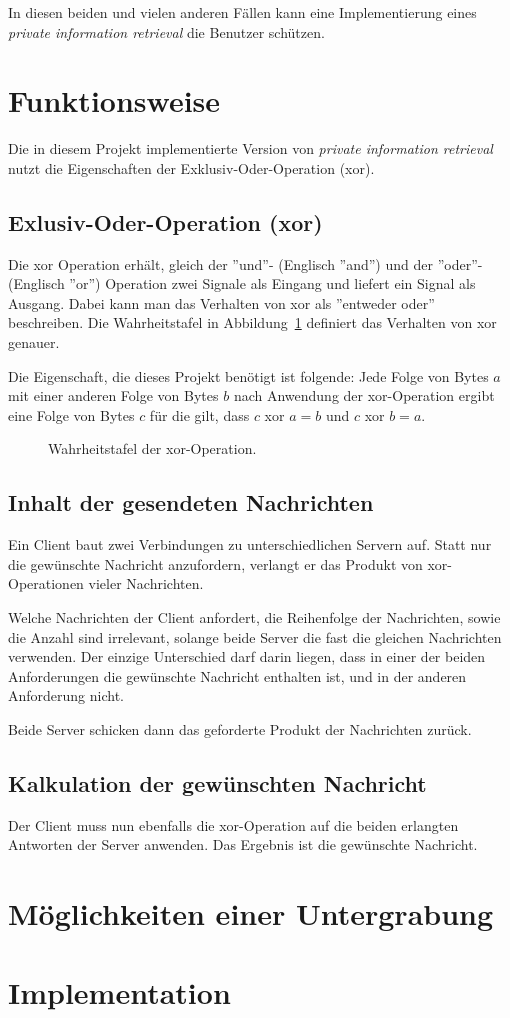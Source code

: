 \documentclass[]{article}
\begin{document}
In diesen beiden und vielen anderen Fällen kann eine Implementierung eines \textit{private information retrieval} die Benutzer schützen.

\section{Funktionsweise}
Die in diesem Projekt implementierte Version von \textit{private information retrieval} nutzt die Eigenschaften der Exklusiv-Oder-Operation (xor).

\subsection{Exlusiv-Oder-Operation (xor)}
Die xor Operation erhält, gleich der ''und''- (Englisch ''and'') und der ''oder''- (Englisch ''or'') Operation zwei Signale als Eingang und liefert ein Signal als Ausgang. Dabei kann man das Verhalten von xor als ''entweder oder'' beschreiben. Die Wahrheitstafel in Abbildung~\ref{fig:wahrheitstafel_xor} definiert das Verhalten von xor genauer.

Die Eigenschaft, die dieses Projekt benötigt ist folgende: Jede Folge von Bytes $a$ mit einer anderen Folge von Bytes $b$ nach Anwendung der xor-Operation ergibt eine Folge von Bytes $c$ für die gilt, dass $c$ xor $a = b$ und $c$ xor $b = a$.

\begin{figure}
	\caption{Wahrheitstafel der xor-Operation.}
	\label{fig:wahrheitstafel_xor}
\end{figure}

\subsection{Inhalt der gesendeten Nachrichten}
Ein Client baut zwei Verbindungen zu unterschiedlichen Servern auf. Statt nur die gewünschte Nachricht anzufordern, verlangt er das Produkt von xor-Operationen vieler Nachrichten.

Welche Nachrichten der Client anfordert, die Reihenfolge der Nachrichten, sowie die Anzahl sind irrelevant, solange beide Server die fast die gleichen Nachrichten verwenden. Der einzige Unterschied darf darin liegen, dass in einer der beiden Anforderungen die gewünschte Nachricht enthalten ist, und in der anderen Anforderung nicht.

Beide Server schicken dann das geforderte Produkt der Nachrichten zurück.

\subsection{Kalkulation der gewünschten Nachricht}
Der Client muss nun ebenfalls die xor-Operation auf die beiden erlangten Antworten der Server anwenden. Das Ergebnis ist die gewünschte Nachricht.

\section{Möglichkeiten einer Untergrabung}

\section{Implementation}
\end{document}
